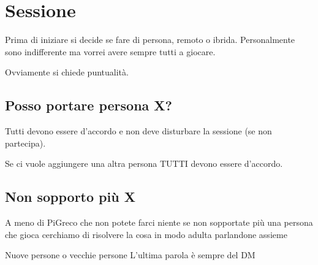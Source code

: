 \section{Sessione}
Prima di iniziare si decide se fare di persona, remoto o ibrida.
Personalmente sono indifferente ma vorrei avere sempre tutti a giocare.

Ovviamente si chiede puntualità.

\subsection{Posso portare persona X?}
Tutti devono essere d'accordo e non deve disturbare la sessione (se non partecipa).

Se ci vuole aggiungere una altra persona TUTTI devono essere d'accordo.

\subsection{Non sopporto più X}
A meno di PiGreco che non potete farci niente se non sopportate più una persona che gioca cerchiamo di risolvere la cosa in modo adulta parlandone assieme

\begin{DndComment}{Nuove persone o vecchie persone}
	L'ultima parola è sempre del DM
\end{DndComment}
